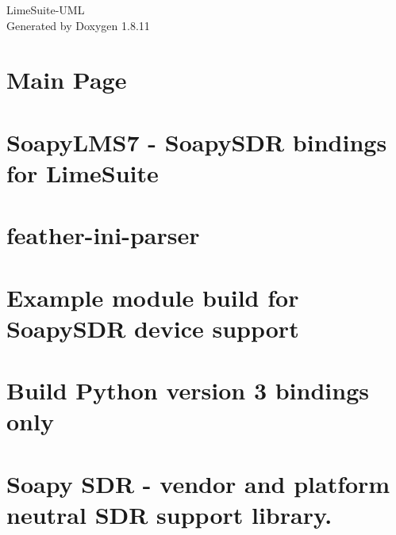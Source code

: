 \documentclass[twoside]{article}
\newcommand{\+}{\discretionary{\mbox{\scriptsize$\hookleftarrow$}}{}{}}
\begin{document}
\begin{titlepage}
\vspace*{7cm}
\begin{center}%
{\Large Lime\+Suite-\/\+U\+ML }\\
\vspace*{1cm}
{\large Generated by Doxygen 1.8.11}\\
\end{center}
\end{titlepage}
\tableofcontents
{}

\section{Main Page}
\label{index}
\section{Soapy\+L\+M\+S7 -\/ Soapy\+S\+DR bindings for Lime\+Suite}
\label{md__home_erik_prefix_default_src_limesuite-dev_SoapyLMS7_README}

\section{feather-\/ini-\/parser}
\label{md__home_erik_prefix_default_src_limesuite-dev_external_cpp-feather-ini-parser_README}

\section{Example module build for Soapy\+S\+DR device support}
\label{md__home_erik_prefix_default_src_soapysdr_ExampleDriver_README}

\section{Build Python version 3 bindings only}
\label{md__home_erik_prefix_default_src_soapysdr_python3_README}

\section{Soapy S\+DR -\/ vendor and platform neutral S\+DR support library.}
\label{md__home_erik_prefix_default_src_soapysdr_README}

\end{document}
